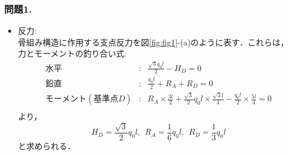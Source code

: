 \documentclass[10pt,a4j]{jarticle}
\begin{document}
\subsubsection*{問題1.}
\begin{itemize}
\item
	{\rm 反力:}\\
	骨組み構造に作用する支点反力を図\ref{fig:fig1}-(a)のように表す．これらは，
	力とモーメントの釣り合い式:
	\begin{eqnarray*}
		水平 &:& \frac{\sqrt{3}q_0l}{2}-H_D=0 \\
		鉛直 &:& \frac{q_0l}{2}+R_A+R_D=0 \\
		モーメント(基準点D) &:& R_A \times \frac{3l}{2}+\frac{\sqrt{3}}{2}q_0l\times \frac{\sqrt{3}l}{4}
		-\frac{q_0l}{2}\times \frac{5l}{4}=0 \\
	\end{eqnarray*}
	より，
	\[
		H_D=\frac{\sqrt{3}}{2}q_0l, \ \ 
		R_A=\frac{1}{6}q_0l, \ \
		R_D=\frac{1}{3}q_0l
	\]	
	と求められる．


\end{itemize}
\end{document}
